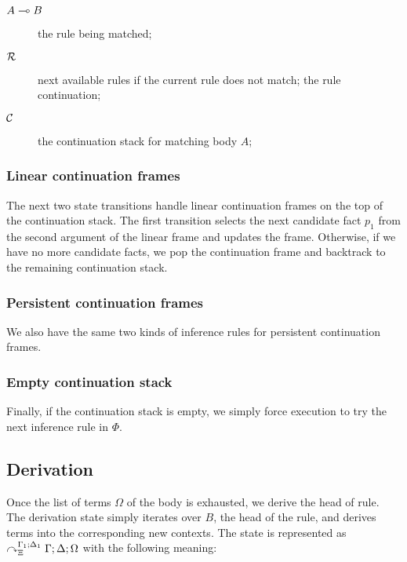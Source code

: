 \begin{description}
   \item[$A \multimap B$] the rule being matched;
   \item[$\mathcal{R}$] next available rules if the current rule does not match;
   the rule continuation;
   \item[$\mathcal{C}$] the continuation stack for matching body $A$;
\end{description}

\subsubsection{Linear continuation frames}

The next two state transitions handle linear continuation frames on the top of the
continuation stack. The first transition selects the next candidate fact $p_1$ from the
second argument of the linear frame and updates the frame. Otherwise, if we have
no more candidate facts, we pop the continuation frame and backtrack to the
remaining continuation stack.



\subsubsection{Persistent continuation frames}

We also have the same two kinds of inference rules for persistent continuation
frames.



\subsubsection{Empty continuation stack}

Finally, if the continuation stack is empty, we simply force execution to try
the next inference rule in $\Phi$.



\subsection{Derivation}

Once the list of terms $\Omega$ of the body is exhausted, we derive the head of
rule.  The derivation state simply iterates over $B$, the head of the rule, and
derives terms into the corresponding new contexts. The state is represented as
$\curvearrowright_{\Xi}^{\Gamma_1; \Delta_1} \Gamma; \Delta; \Omega$ with the following meaning:

